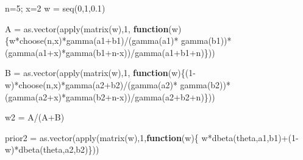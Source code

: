 \documentclass[
]{book}
\newenvironment{Shaded}{\begin{snugshade}}{\end{snugshade}}
\newcommand{\ControlFlowTok}[1]{\textcolor[rgb]{0.13,0.29,0.53}{\textbf{#1}}}
\newcommand{\DecValTok}[1]{\textcolor[rgb]{0.00,0.00,0.81}{#1}}
\newcommand{\FloatTok}[1]{\textcolor[rgb]{0.00,0.00,0.81}{#1}}
\newcommand{\FunctionTok}[1]{\textcolor[rgb]{0.00,0.00,0.00}{#1}}
\newcommand{\NormalTok}[1]{#1}
\newcommand{\OtherTok}[1]{\textcolor[rgb]{0.56,0.35,0.01}{#1}}
\newcommand{\SpecialCharTok}[1]{\textcolor[rgb]{0.00,0.00,0.00}{#1}}
\begin{document}
\begin{Shaded}
\begin{Highlighting}[]
\NormalTok{n}\OtherTok{=}\DecValTok{5}\NormalTok{; x}\OtherTok{=}\DecValTok{2}
\NormalTok{w }\OtherTok{=} \FunctionTok{seq}\NormalTok{(}\DecValTok{0}\NormalTok{,}\DecValTok{1}\NormalTok{,}\FloatTok{0.1}\NormalTok{)}

\NormalTok{A }\OtherTok{=} \FunctionTok{as.vector}\NormalTok{(}\FunctionTok{apply}\NormalTok{(}\FunctionTok{matrix}\NormalTok{(w),}\DecValTok{1}\NormalTok{,}
  \ControlFlowTok{function}\NormalTok{(w)\{w}\SpecialCharTok{*}\FunctionTok{choose}\NormalTok{(n,x)}\SpecialCharTok{*}\FunctionTok{gamma}\NormalTok{(a1}\SpecialCharTok{+}\NormalTok{b1)}\SpecialCharTok{/}\NormalTok{(}\FunctionTok{gamma}\NormalTok{(a1)}\SpecialCharTok{*}
    \FunctionTok{gamma}\NormalTok{(b1))}\SpecialCharTok{*}\NormalTok{(}\FunctionTok{gamma}\NormalTok{(a1}\SpecialCharTok{+}\NormalTok{x)}\SpecialCharTok{*}\FunctionTok{gamma}\NormalTok{(b1}\SpecialCharTok{+}\NormalTok{n}\SpecialCharTok{{-}}\NormalTok{x))}\SpecialCharTok{/}\FunctionTok{gamma}\NormalTok{(a1}\SpecialCharTok{+}\NormalTok{b1}\SpecialCharTok{+}\NormalTok{n)\}))}

\NormalTok{B }\OtherTok{=} \FunctionTok{as.vector}\NormalTok{(}\FunctionTok{apply}\NormalTok{(}\FunctionTok{matrix}\NormalTok{(w),}\DecValTok{1}\NormalTok{,}
  \ControlFlowTok{function}\NormalTok{(w)\{(}\DecValTok{1}\SpecialCharTok{{-}}\NormalTok{w)}\SpecialCharTok{*}\FunctionTok{choose}\NormalTok{(n,x)}\SpecialCharTok{*}\FunctionTok{gamma}\NormalTok{(a2}\SpecialCharTok{+}\NormalTok{b2)}\SpecialCharTok{/}\NormalTok{(}\FunctionTok{gamma}\NormalTok{(a2)}\SpecialCharTok{*}
    \FunctionTok{gamma}\NormalTok{(b2))}\SpecialCharTok{*}\NormalTok{(}\FunctionTok{gamma}\NormalTok{(a2}\SpecialCharTok{+}\NormalTok{x)}\SpecialCharTok{*}\FunctionTok{gamma}\NormalTok{(b2}\SpecialCharTok{+}\NormalTok{n}\SpecialCharTok{{-}}\NormalTok{x))}\SpecialCharTok{/}\FunctionTok{gamma}\NormalTok{(a2}\SpecialCharTok{+}\NormalTok{b2}\SpecialCharTok{+}\NormalTok{n)\}))}

\NormalTok{w2 }\OtherTok{=}\NormalTok{ A}\SpecialCharTok{/}\NormalTok{(A}\SpecialCharTok{+}\NormalTok{B)}

\NormalTok{prior2 }\OtherTok{=} \FunctionTok{as.vector}\NormalTok{(}\FunctionTok{apply}\NormalTok{(}\FunctionTok{matrix}\NormalTok{(w),}\DecValTok{1}\NormalTok{,}\ControlFlowTok{function}\NormalTok{(w)\{}
\NormalTok{  w}\SpecialCharTok{*}\FunctionTok{dbeta}\NormalTok{(theta,a1,b1)}\SpecialCharTok{+}\NormalTok{(}\DecValTok{1}\SpecialCharTok{{-}}\NormalTok{w)}\SpecialCharTok{*}\FunctionTok{dbeta}\NormalTok{(theta,a2,b2)\}))}


\end{Highlighting}
\end{Shaded}
\end{document}
